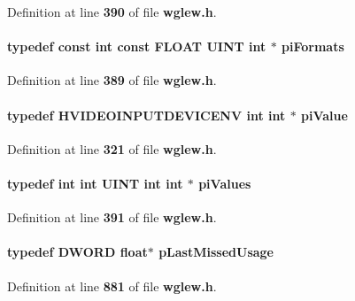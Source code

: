 Definition at line {\bf 390} of file {\bf wglew.\+h}.

\paragraph[{pi\+Formats}]{\setlength{\rightskip}{0pt plus 5cm}typedef const {\bf int} const F\+L\+O\+AT {\bf U\+I\+NT} {\bf int} $\ast$ {\bf pi\+Formats}}\label{wglew_8h_a9656c2f569817c343a4ad0d71a0918fe}


Definition at line {\bf 389} of file {\bf wglew.\+h}.

\paragraph[{pi\+Value}]{\setlength{\rightskip}{0pt plus 5cm}typedef H\+V\+I\+D\+E\+O\+I\+N\+P\+U\+T\+D\+E\+V\+I\+C\+E\+NV {\bf int} {\bf int} $\ast$ {\bf pi\+Value}}\label{wglew_8h_afd25cb0f974415c74f00d0ad16a589f8}


Definition at line {\bf 321} of file {\bf wglew.\+h}.

\paragraph[{pi\+Values}]{\setlength{\rightskip}{0pt plus 5cm}typedef {\bf int} {\bf int} {\bf U\+I\+NT} {\bf int} {\bf int} $\ast$ {\bf pi\+Values}}\label{wglew_8h_aa99a7e53442b8cd89b1d3cd5b4134fc7}


Definition at line {\bf 391} of file {\bf wglew.\+h}.

\paragraph[{p\+Last\+Missed\+Usage}]{\setlength{\rightskip}{0pt plus 5cm}typedef D\+W\+O\+RD float$\ast$ {\bf p\+Last\+Missed\+Usage}}\label{wglew_8h_ac6905da435c6e8d0b38fdc407c8d9507}


Definition at line {\bf 881} of file {\bf wglew.\+h}.

